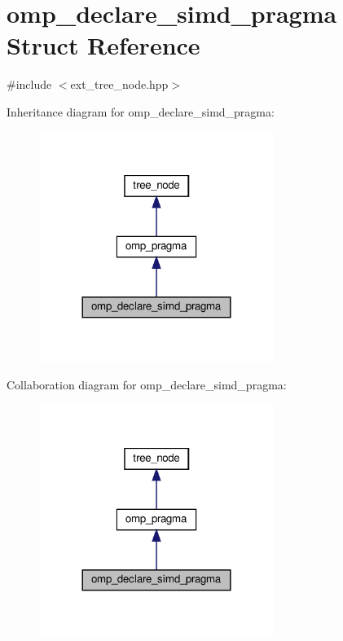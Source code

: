 \hypertarget{structomp__declare__simd__pragma}{}\section{omp\+\_\+declare\+\_\+simd\+\_\+pragma Struct Reference}
\label{structomp__declare__simd__pragma}


{\ttfamily \#include $<$ext\+\_\+tree\+\_\+node.\+hpp$>$}



Inheritance diagram for omp\+\_\+declare\+\_\+simd\+\_\+pragma\+:
\nopagebreak
\begin{figure}[H]
\begin{center}
\leavevmode
\includegraphics[width=216pt]{da/dee/structomp__declare__simd__pragma__inherit__graph}
\end{center}
\end{figure}


Collaboration diagram for omp\+\_\+declare\+\_\+simd\+\_\+pragma\+:
\nopagebreak
\begin{figure}[H]
\begin{center}
\leavevmode
\includegraphics[width=216pt]{dd/d32/structomp__declare__simd__pragma__coll__graph}
\end{center}
\end{figure}
